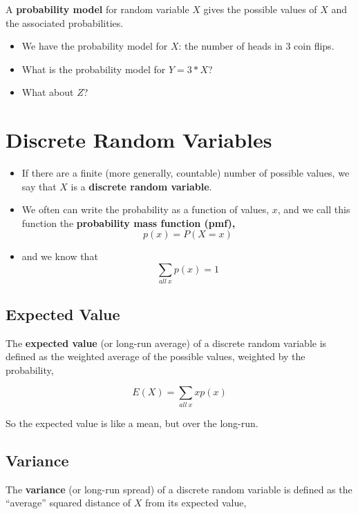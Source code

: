 \documentclass[
]{book}
\providecommand{\tightlist}{%
  \setlength{\itemsep}{0pt}\setlength{\parskip}{0pt}}
\begin{document}
A \textbf{probability model} for random variable \(X\) gives the possible values of \(X\) and the associated probabilities.

\begin{itemize}
\tightlist
\item
  We have the probability model for \(X\): the number of heads in 3 coin flips.
\item
  What is the probability model for \(Y= 3*X\)?
\item
  What about \(Z\)?
\end{itemize}

\hypertarget{discrete-random-variables}{%
\section{Discrete Random Variables}\label{discrete-random-variables}}

\begin{itemize}
\item
  If there are a finite (more generally, countable) number of possible values, we say that \(X\) is a \textbf{discrete random variable}.
\item
  We often can write the probability as a function of values, \(x\), and we call this function the \textbf{probability mass function (pmf),}
  \[p(x) = P(X = x)\]
\item
  and we know that
  \[\sum_{all~x}p(x) = 1\]
\end{itemize}

\hypertarget{expected-value}{%
\subsection{Expected Value}\label{expected-value}}

The \textbf{expected value} (or long-run average) of a discrete random variable is defined as the weighted average of the possible values, weighted by the probability,

\[E(X) = \sum_{all~x} xp(x)\]

So the expected value is like a mean, but over the long-run.

\hypertarget{variance}{%
\subsection{Variance}\label{variance}}

The \textbf{variance} (or long-run spread) of a discrete random variable is defined as the ``average'' squared distance of \(X\) from its expected value,
\end{document}
